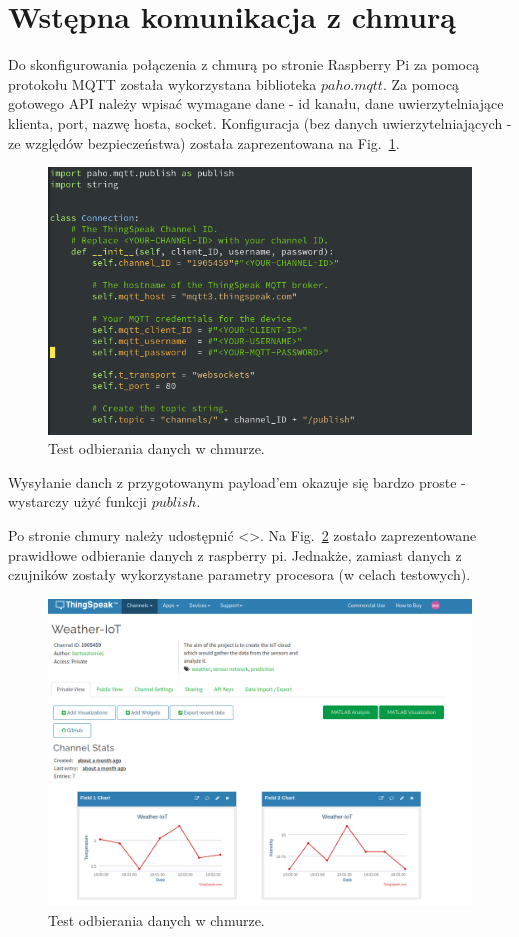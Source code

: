 \documentclass[runningheads]{llncs}
\begin{document}
\section{Wstępna komunikacja z chmurą}
Do skonfigurowania połączenia z chmurą po stronie Raspberry Pi za pomocą protokołu MQTT została wykorzystana biblioteka $paho.mqtt$.
Za pomocą gotowego API należy wpisać wymagane dane - id kanału, dane uwierzytelniające klienta, port, nazwę hosta, socket.
Konfiguracja (bez danych uwierzytelniających - ze względów bezpieczeństwa) została zaprezentowana na Fig.~\ref{fig1}.
\begin{figure}
  \centering
  \includegraphics[width=\textwidth]{kod.png}
  \caption{Test odbierania danych w chmurze.} \label{fig1}    
\end{figure}

Wysyłanie danch z przygotowanym payload'em okazuje się bardzo proste - wystarczy użyć funkcji $publish$.

Po stronie chmury należy udostępnić <>. Na Fig.~\ref{fig2} zostało zaprezentowane prawidłowe odbieranie danych z raspberry pi. Jednakże, zamiast danych z czujników zostały wykorzystane parametry procesora (w celach testowych).
\begin{figure}
  \centering
  \includegraphics[width=\textwidth]{chumra.png}
  \caption{Test odbierania danych w chmurze.} \label{fig2}    
\end{figure}
\end{document}
